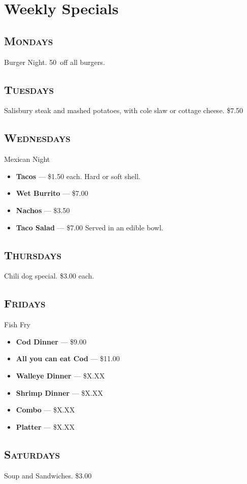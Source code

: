 \documentclass{tufte-handout}
\begin{document}
\section{Weekly Specials}
\subsection{\textsc{Mondays}}
Burger Night. 50\textcent \ off all burgers.

\begin{fullwidth}

\subsection{\textsc{Tuesdays}}
Salisbury steak and mashed potatoes, with cole slaw or cottage cheese. \$7.50

\subsection{\textsc{Wednesdays}}
Mexican Night
\begin{itemize}
\item \textbf{Tacos} --- \$1.50 each. Hard or soft shell.
\item \textbf{Wet Burrito} --- \$7.00
\item \textbf{Nachos} --- \$3.50
\item \textbf{Taco Salad} --- \$7.00 Served in an edible bowl.
\end{itemize}

\subsection{\textsc{Thursdays}}
Chili dog special. \$3.00 each.

\subsection{\textsc{Fridays}}
Fish Fry
\begin{itemize}
\item \textbf{Cod Dinner} --- \$9.00
\item \textbf{All you can eat Cod} --- \$11.00
\item \textbf{Walleye Dinner} --- \$X.XX
\item \textbf{Shrimp Dinner} --- \$X.XX
\item \textbf{Combo} --- \$X.XX
\item \textbf{Platter} --- \$X.XX
\end{itemize}

\subsection{\textsc{Saturdays}}

Soup and Sandwiches. \$3.00

\end{fullwidth}
\end{document}

